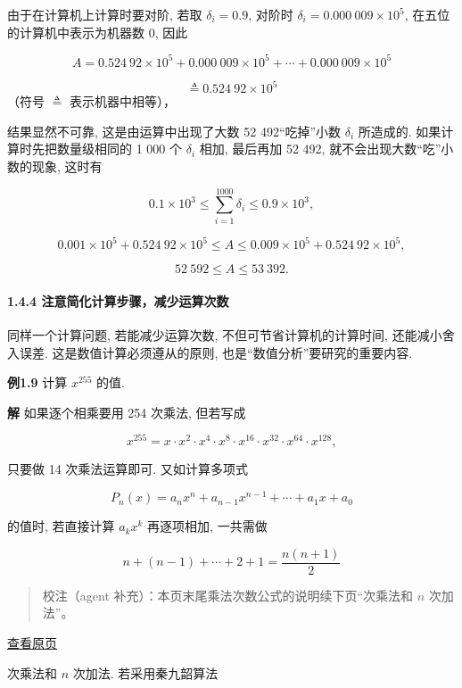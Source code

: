 \documentclass[
  10pt,
  fontset=fandol]{ctexart}
\begin{document}
由于在计算机上计算时要对阶, 若取 \(\delta_i = 0.9\), 对阶时 \(\delta_i = 0.000\ 009 \times 10^5\), 在五位的计算机中表示为机器数 0, 因此

\[
A = 0.524\ 92 \times 10^5 + 0.000\ 009 \times 10^5 + \cdots + 0.000\ 009 \times 10^5
\]

\[
\triangleq 0.524\ 92 \times 10^5
\] （符号 \(\triangleq\) 表示机器中相等），

结果显然不可靠, 这是由运算中出现了大数 52 492``吃掉''小数 \(\delta_i\) 所造成的. 如果计算时先把数量级相同的 1 000 个 \(\delta_i\) 相加, 最后再加 52 492, 就不会出现大数``吃''小数的现象, 这时有

\[
0.1 \times 10^3 \leqslant \sum_{i=1}^{1000} \delta_i \leqslant 0.9 \times 10^3,
\]

\[
0.001 \times 10^5 + 0.524\ 92 \times 10^5 \leqslant A \leqslant 0.009 \times 10^5 + 0.524\ 92 \times 10^5,
\]

\[
52\ 592 \leqslant A \leqslant 53\ 392.
\]

\paragraph{1.4.4 注意简化计算步骤，减少运算次数}\label{ux6ce8ux610fux7b80ux5316ux8ba1ux7b97ux6b65ux9aa4ux51cfux5c11ux8fd0ux7b97ux6b21ux6570}

同样一个计算问题, 若能减少运算次数, 不但可节省计算机的计算时间, 还能减小舍入误差. 这是数值计算必须遵从的原则, 也是``数值分析''要研究的重要内容.

\textbf{例1.9} 计算 \(x^{255}\) 的值.

\textbf{解} 如果逐个相乘要用 254 次乘法, 但若写成

\[
x^{255} = x \cdot x^2 \cdot x^4 \cdot x^8 \cdot x^{16} \cdot x^{32} \cdot x^{64} \cdot x^{128},
\]

只要做 14 次乘法运算即可. 又如计算多项式

\[
P_n(x) = a_n x^n + a_{n-1} x^{n-1} + \cdots + a_1 x + a_0
\]

的值时, 若直接计算 \(a_k x^k\) 再逐项相加, 一共需做

\[
n + (n-1) + \cdots + 2 + 1 = \frac{n(n+1)}{2}
\]

\begin{quote}
校注（agent 补充）：本页末尾乘法次数公式的说明续下页``次乘法和 \(n\) 次加法''。
\end{quote}

\href{../../source-images/pdf-025.jpeg}{查看原页}

次乘法和 \(n\) 次加法. 若采用秦九韶算法
\end{document}
